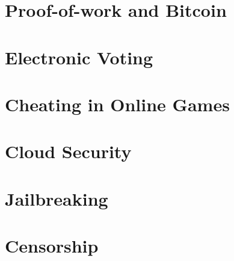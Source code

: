 \documentclass[10pt,landscape]{article}
\begin{document}
\begin{multicols}{3}

\section{Proof-of-work and Bitcoin}


\section{Electronic Voting}


\section{Cheating in Online Games}


\section{Cloud Security}


\section{Jailbreaking}


\section{Censorship}


\end{multicols}
\end{document}
